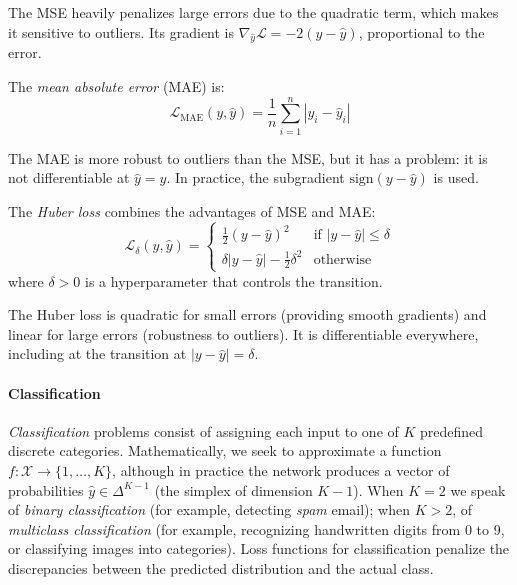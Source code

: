 The \gls{MSE} heavily penalizes large errors due to the quadratic term, which makes it sensitive to outliers. Its gradient is \(\nabla_{\hat{y}} \mathcal{L} = -2(y - \hat{y})\), proportional to the error.

\begin{definition}\label{def:mae}
	The \textit{mean absolute error} (\gls{MAE}) is:
	\[
		\mathcal{L}_{\text{MAE}}(y, \hat{y}) = \frac{1}{n} \sum_{i=1}^{n} |y_i - \hat{y}_i|
	\]
\end{definition}

The \gls{MAE} is more robust to outliers than the \gls{MSE}, but it has a problem: it is not differentiable at \(\hat{y} = y\). In practice, the subgradient \(\text{sign}(y - \hat{y})\) is used.

\begin{definition}\label{def:huber}
	The \textit{Huber loss} combines the advantages of \gls{MSE} and \gls{MAE}:
	\[
		\mathcal{L}_{\delta}(y, \hat{y}) = \begin{cases}
			\frac{1}{2}(y - \hat{y})^2 & \text{if } |y - \hat{y}| \leq \delta \\
			\delta |y - \hat{y}| - \frac{1}{2}\delta^2 & \text{otherwise}
		\end{cases}
	\]
	where \(\delta > 0\) is a hyperparameter that controls the transition.
\end{definition}

The Huber loss is quadratic for small errors (providing smooth gradients) and linear for large errors (robustness to outliers). It is differentiable everywhere, including at the transition at \(|y - \hat{y}| = \delta\).

\paragraph{Classification}

\textit{Classification} problems consist of assigning each input to one of \(K\) predefined discrete categories. Mathematically, we seek to approximate a function \(f: \mathcal{X} \to \{1, \ldots, K\}\), although in practice the network produces a vector of probabilities \(\hat{y} \in \Delta^{K-1}\) (the simplex of dimension \(K-1\)). When \(K = 2\) we speak of \textit{binary classification} (for example, detecting \textit{spam} email); when \(K > 2\), of \textit{multiclass classification} (for example, recognizing handwritten digits from 0 to 9, or classifying images into categories). Loss functions for classification penalize the discrepancies between the predicted distribution and the actual class.

